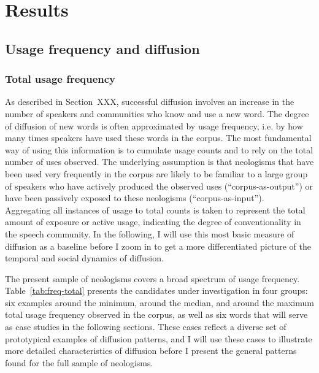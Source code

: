 \documentclass[
  a4paper,
  abstract=on,
  captions=tableabove
  ]{scrartcl}
\begin{document}
\section{Results}
  \label{sec:results}

  \subsection{Usage frequency and diffusion}
    \label{subsec:freq}

    \subsubsection{Total usage frequency}
      \label{subsec:total-freq}

      As described in Section~XXX, successful diffusion involves an increase in the number of speakers and communities who know and use a new word. The degree of diffusion of new words is often approximated by usage frequency, i.e. by how many times speakers have used these words in the corpus. The most fundamental way of using this information is to cumulate usage counts and to rely on the total number of uses observed. The underlying assumption is that neologisms that have been used very frequently in the corpus are likely to be familiar to a large group of speakers who have actively produced the observed uses (\enquote{corpus-as-output}) or have been passively exposed to these neologisms (\enquote{corpus-as-input}).~\parencite{Stefanowitsch2017CorpusbasedPerspective} Aggregating all instances of usage to total counts is taken to represent the total amount of exposure or active usage, indicating the degree of conventionality in the speech community. In the following, I will use this most basic measure of diffusion as a baseline before I zoom in to get a more differentiated picture of the temporal and social dynamics of diffusion.

      The present sample of neologisms covers a broad spectrum of usage frequency. Table~\ref{tab:freq-total} presents the candidates under investigation in four groups: six examples around the minimum, around the median, and around the maximum total usage frequency observed in the corpus, as well as six words that will serve as case studies in the following sections. These cases reflect a diverse set of prototypical examples of diffusion patterns, and I will use these cases to illustrate more detailed characteristics of diffusion before I present the general patterns found for the full sample of neologisms.
\end{document}
